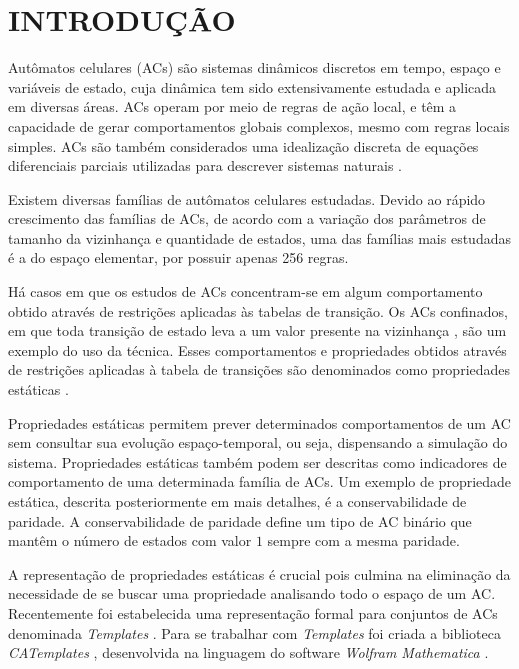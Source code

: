 \section{INTRODUÇÃO}
\label{sec:introducao}

Autômatos celulares (ACs) são sistemas dinâmicos discretos em tempo, espaço e variáveis de estado, cuja dinâmica tem sido extensivamente estudada e aplicada em diversas áreas.
ACs operam por meio de regras de ação local, e têm a capacidade de gerar comportamentos globais complexos, mesmo com regras locais simples.
ACs são também considerados uma idealização discreta de equações diferenciais parciais utilizadas para descrever sistemas naturais \cite{wolfram1994cellular}.

Existem diversas famílias de autômatos celulares estudadas. Devido ao rápido crescimento das famílias de ACs, de acordo com a variação dos parâmetros de tamanho da vizinhança e quantidade de estados, uma das famílias mais estudadas é a do espaço elementar, por possuir apenas 256 regras.

Há casos em que os estudos de ACs concentram-se em algum comportamento obtido através de restrições aplicadas às tabelas de transição. Os ACs confinados, em que toda transição de estado leva a um valor presente na vizinhança \cite{theyssier2004captive}, são um exemplo do uso da técnica. Esses comportamentos e propriedades obtidos através de restrições aplicadas à tabela de transições são denominados como propriedades estáticas \cite{Verardo2014}.

Propriedades estáticas permitem prever determinados comportamentos de um AC sem consultar sua evolução espaço-temporal, ou seja, dispensando a simulação do sistema. Propriedades estáticas também podem ser descritas como indicadores de comportamento de uma determinada família de ACs. Um exemplo de propriedade estática, descrita posteriormente em mais detalhes, é a conservabilidade de paridade. A conservabilidade de paridade define um tipo de AC binário que mantêm o número de estados com valor $1$ sempre com a mesma paridade.

A representação de propriedades estáticas é crucial pois culmina na eliminação da necessidade de se buscar uma propriedade analisando todo o espaço de um AC. Recentemente foi estabelecida uma representação formal para conjuntos de ACs denominada \textit{Templates} \cite{deOliveira2014,deOliveira2014b}. Para se trabalhar com  \textit{Templates} foi criada a biblioteca \textit{CATemplates} \cite{CATemplates}, desenvolvida na linguagem do software \textit{Wolfram Mathematica} \cite{woframMathematica10}.

